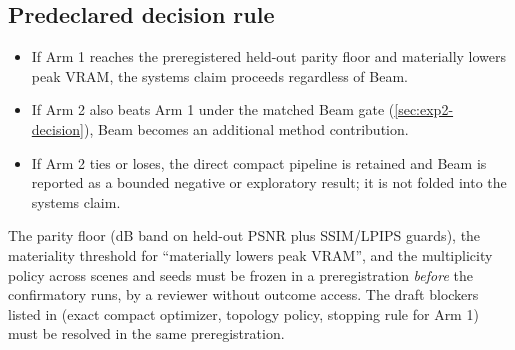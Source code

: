 \subsection{Predeclared decision rule}
\label{sec:decision-rule}

\begin{itemize}[leftmargin=1.6em,itemsep=1pt]
  \item If Arm 1 reaches the preregistered held-out parity floor and materially lowers peak
        VRAM, the systems claim proceeds regardless of Beam.
  \item If Arm 2 also beats Arm 1 under the matched Beam gate (\cref{sec:exp2-decision}), Beam
        becomes an additional method contribution.
  \item If Arm 2 ties or loses, the direct compact pipeline is retained and Beam is reported as
        a bounded negative or exploratory result; it is not folded into the systems claim.
\end{itemize}

\begin{ToShowBlock}
The parity floor (dB band on held-out PSNR plus SSIM/LPIPS guards), the materiality threshold
for ``materially lowers peak VRAM'', and the multiplicity policy across scenes and seeds must
be frozen in a preregistration \emph{before} the confirmatory runs, by a reviewer without
outcome access.  The draft blockers listed in
 (exact compact optimizer, topology policy,
stopping rule for Arm 1) must be resolved in the same preregistration.
\end{ToShowBlock}
